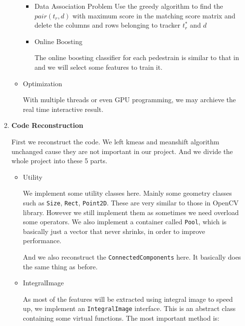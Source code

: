 \documentclass[a4paper]{article}
\begin{document}
\begin{enumerate}
\begin{itemize}
\begin{itemize}

\item Data Association Problem
Use the greedy algorithm to find the $pair(t_r,d)$ with maximum score in the matching score matrix and delete the columns and rows belonging to tracker $t_r^*$ and $d$ 

\item Online Boosting

The online boosting classifier for each pedestrain is similar to that in \cite{Grabner:2006:OBV:1153170.1153451} and we will select some features to train it.

\end{itemize}

\item Optimization

With multiple threads or even GPU programming, we may archieve the real time interactive result.

\end{itemize}

\item \textbf{Code Reconstruction}

First we reconstruct the code. We left kmeas and meanshift algorithm unchanged cause they are not important in our project. And we divide the whole project into these 5 parts.

\begin{itemize}

\item Utility

We implement some utility classes here. Mainly some geometry classes such as \lstinline{Size}, \lstinline{Rect}, \lstinline{Point2D}. These are very similar to those in OpenCV library. However we still implement them as sometimes we need overload some operators. We also implement a container called \lstinline{Pool}, which is basically just a vector that never shrinks, in order to improve performance.

And we also reconstruct the \lstinline{ConnectedComponents} here. It basically does the same thing as before.

\item IntegralImage

As most of the features will be extracted using integral image to speed up, we implement an \lstinline{IntegralImage} interface. This is an abstract class containing some virtual functions. The most important method is:


\end{itemize}
\end{enumerate}
\end{document}
